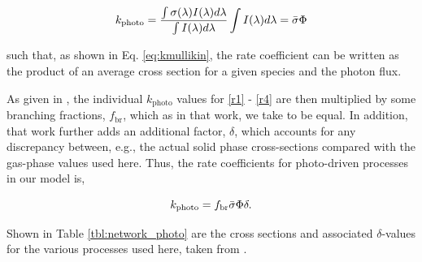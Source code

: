 \documentclass[journal=aesccq,manuscript=draft]{achemso}
\begin{document}
\begin{equation}
    k_\mathrm{photo} = \frac{\int \sigma(\lambda)I(\lambda)d\lambda}{\int I(\lambda)d\lambda} \int I(\lambda)d\lambda = \Bar{\sigma}\Phi
    \label{eq:kmullikin}
\end{equation}

\noindent
such that, as shown in Eq. \eqref{eq:kmullikin}, the rate coefficient can be written as the product of an average cross section for a given species and the photon flux. 

As given in \citet{mullikin_new_2021}, the individual $k_\mathrm{photo}$ values for \eqref{r1} - \eqref{r4} are then multiplied by some branching fractions, $f_\mathrm{br}$, which as in that work, we take to be equal. In addition, that work further adds an additional factor, $\delta$, which accounts for any discrepancy between, e.g., the actual solid phase cross-sections compared with the gas-phase values used here. Thus, the rate coefficients for photo-driven processes in our model is,

\begin{equation}
    k_\mathrm{photo} = f_\mathrm{br}\Bar{\sigma}\Phi\delta.
\end{equation}

\noindent
Shown in Table \ref{tbl:network_photo} are the cross sections and associated $\delta$-values for the various processes used here, taken from \citet{mullikin_new_2021}.

\end{document}
